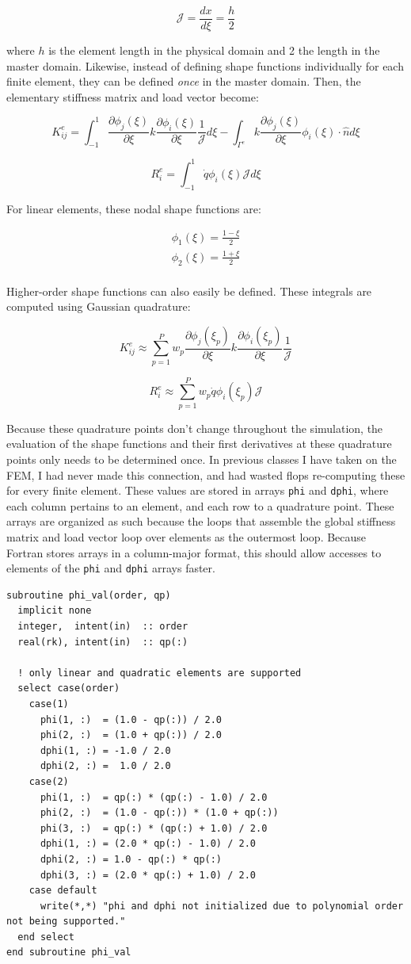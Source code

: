 \documentclass[10pt]{article}
\newcommand{\beq}{\begin{equation}}
\newcommand{\eeq}{\end{equation}}
\newcommand{\beqa}{\begin{equation}\begin{aligned}}
\newcommand{\eeqa}{\end{aligned}\end{equation}}
\begin{document}
\beq
\mathscr{J}=\frac{dx}{d\xi}=\frac{h}{2}
\eeq

where \(h\) is the element length in the physical domain and 2 the length in the master domain. Likewise, instead of defining shape functions individually for each finite element, they can be defined {\it once} in the master domain. Then, the elementary stiffness matrix and load vector become:

\beq
K_{ij}^e=\int_{-1}^{1}\frac{\partial \phi_j(\xi)}{\partial \xi}k\frac{\partial\phi_i(\xi)}{\partial \xi}\frac{1}{\mathscr{J}}d\xi-\int_{\Gamma^e}k\frac{\partial \phi_j(\xi)}{\partial \xi}\phi_i(\xi)\cdot\hat{n}d\xi
\eeq

\beq
R_{i}^e=\int_{-1}^{1}\dot{q}\phi_i(\xi)\mathscr{J}d\xi
\eeq

For linear elements, these nodal shape functions are:

\beqa
\phi_1(\xi)=\frac{1-\xi}{2}\\
\phi_2(\xi)=\frac{1+\xi}{2}\\
\eeqa

Higher-order shape functions can also easily be defined. These integrals are computed using Gaussian quadrature:

\beq
K_{ij}^e\approx\sum_{p=1}^{P}w_p\frac{\partial \phi_j(\xi_p)}{\partial \xi}k\frac{\partial\phi_i(\xi_p)}{\partial \xi}\frac{1}{\mathscr{J}}
\eeq

\beq
R_{i}^e\approx\sum_{p=1}^{P}w_p\dot{q}\phi_i(\xi_p)\mathscr{J}
\eeq

Because these quadrature points don't change throughout the simulation, the evaluation of the shape functions and their first derivatives at these quadrature points only needs to be determined once. In previous classes I have taken on the FEM, I had never made this connection, and had wasted flops re-computing these for every finite element. These values are stored in arrays {\tt phi} and {\tt dphi}, where each column pertains to an element, and each row to a quadrature point. These arrays are organized as such because the loops that assemble the global stiffness matrix and load vector loop over elements as the outermost loop. Because Fortran stores arrays in a column-major format, this should allow accesses to elements of the {\tt phi} and {\tt dphi} arrays faster.

\begin{lstlisting}
subroutine phi_val(order, qp)
  implicit none
  integer,  intent(in)  :: order
  real(rk), intent(in)  :: qp(:)

  ! only linear and quadratic elements are supported
  select case(order)
    case(1)
      phi(1, :)  = (1.0 - qp(:)) / 2.0
      phi(2, :)  = (1.0 + qp(:)) / 2.0
      dphi(1, :) = -1.0 / 2.0
      dphi(2, :) =  1.0 / 2.0
    case(2)
      phi(1, :)  = qp(:) * (qp(:) - 1.0) / 2.0
      phi(2, :)  = (1.0 - qp(:)) * (1.0 + qp(:))
      phi(3, :)  = qp(:) * (qp(:) + 1.0) / 2.0
      dphi(1, :) = (2.0 * qp(:) - 1.0) / 2.0
      dphi(2, :) = 1.0 - qp(:) * qp(:)
      dphi(3, :) = (2.0 * qp(:) + 1.0) / 2.0
    case default
      write(*,*) "phi and dphi not initialized due to polynomial order not being supported."
  end select
end subroutine phi_val
\end{lstlisting}
\end{document}
